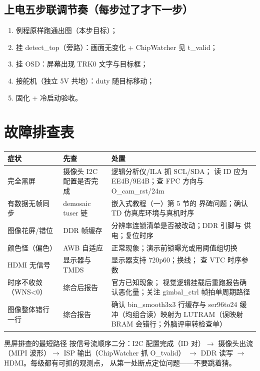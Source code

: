 \documentclass[11pt]{ctexart}
\begin{document}
\subsection{上电五步联调节奏（每步过了才下一步）}

\begin{enumerate}
  \item 例程原样跑通出图（本步目标）；
  \item 挂 detect\_top（旁路）：画面无变化 + ChipWatcher 见 t\_valid；
  \item 挂 OSD：屏幕出现 TRK0 文字与目标框；
  \item 接舵机（独立 5V 共地）：duty 随目标移动；
  \item 固化 + 冷启动验收。
\end{enumerate}

\section{故障排查表}

\begin{center}
\begin{tabular}{p{3.6cm}p{4.6cm}p{4.6cm}}
\toprule
\rowcolor{rowtint}\textbf{症状} & \textbf{先查} & \textbf{处置} \\
\midrule
完全黑屏 & 摄像头 I2C 配置是否完成 & 逻辑分析仪/ILA 抓 SCL/SDA；
读 ID 应为 EE4B/9E4B；查 FPC 方向与 O\_cam\_rst/24m \\
有数据无帧同步 & demosaic tuser 链 & 嵌入式教程（一）第 5 节的
界碑问题；确认 TD 仿真库环境与真机时序 \\
图像花屏/错位 & DDR 帧缓存 & 分辨率连锁清单是否被改动；DDR 引脚与
供电；复位时序 \\
颜色怪（偏色） & AWB 自适应 & 正常现象；演示前锁曝光或用阈值组切换 \\
HDMI 无信号 & 显示器与 TMDS & 显示器支持 720p60；换线；
查 VTC 时序参数 \\
时序不收敛（WNS<0） & 综合后报告 & 官方已知现象；
视觉逻辑挂载后重跑报告确认恶化量；关注 gimbal\_ctrl 帧拍单周期路径 \\
图像整体错行一行 & 综合报告 & 确认 bin\_smooth3x3 行缓存与 ser96to24
缓冲（均组合读）映射为 LUTRAM（误映射 BRAM 会错行；外脑评审转检查单） \\
\bottomrule
\end{tabular}
\end{center}

\begin{keybox}{黑屏排查的最短路径}
按信号流顺序二分：I2C 配置完成（ID 对）$\rightarrow$ 摄像头出流
（MIPI 波形）$\rightarrow$ ISP 输出（ChipWatcher 抓 O\_tvalid）
$\rightarrow$ DDR 读写 $\rightarrow$ HDMI。每级都有可抓的观测点，
从第一处断点定位问题——不要跳着猜。
\end{keybox}
\end{document}
